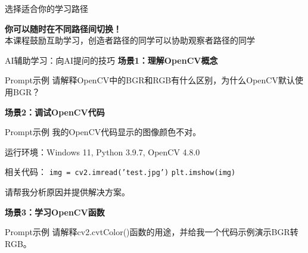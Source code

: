 \begin{frame}{选择适合你的学习路径}
    \vspace{0.5cm}
    \begin{center}
        \textbf{你可以随时在不同路径间切换！}\\
        \small 本课程鼓励互助学习，创造者路径的同学可以协助观察者路径的同学
    \end{center}
\end{frame}

\begin{frame}{AI辅助学习：向AI提问的技巧}
    \textbf{场景1：理解OpenCV概念}
    \begin{exampleblock}{Prompt示例}
        请解释OpenCV中的BGR和RGB有什么区别，为什么OpenCV默认使用BGR？
    \end{exampleblock}

    \vspace{0.3cm}

    \textbf{场景2：调试OpenCV代码}
    \begin{exampleblock}{Prompt示例}
        我的OpenCV代码显示的图像颜色不对。

        运行环境：Windows 11, Python 3.9.7, OpenCV 4.8.0

        相关代码：
        \texttt{img = cv2.imread('test.jpg')}
        \texttt{plt.imshow(img)}

        请帮我分析原因并提供解决方案。
    \end{exampleblock}

    \vspace{0.3cm}

    \textbf{场景3：学习OpenCV函数}
    \begin{exampleblock}{Prompt示例}
        请解释cv2.cvtColor()函数的用途，并给我一个代码示例演示BGR转RGB。
    \end{exampleblock}
\end{frame}

